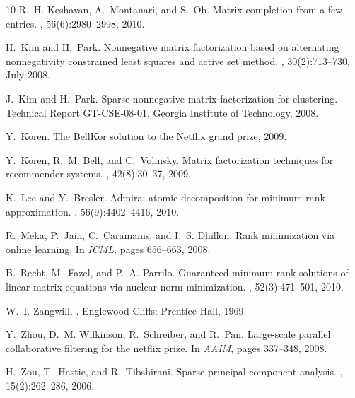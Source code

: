 \documentclass[11pt]{article}
\theoremstyle{plain}
\theoremstyle{definition}
\begin{document}
\begin{thebibliography}{10}
R.~H. Keshavan, A.~Montanari, and S.~Oh.
\newblock Matrix completion from a few entries.
, 56(6):2980--2998,
  2010.

H.~Kim and H.~Park.
\newblock Nonnegative matrix factorization based on alternating nonnegativity
  constrained least squares and active set method.
, 30(2):713--730, July 2008.

J.~Kim and H.~Park.
\newblock Sparse nonnegative matrix factorization for clustering.
\newblock Technical Report GT-CSE-08-01, Georgia Institute of Technology, 2008.

Y.~Koren.
\newblock The {B}ell{K}or solution to the {N}etflix grand prize, 2009.

Y.~Koren, R.~M. Bell, and C.~Volinsky.
\newblock Matrix factorization techniques for recommender systems.
, 42(8):30--37, 2009.

K.~Lee and Y.~Bresler.
\newblock Admira: atomic decomposition for minimum rank approximation.
, 56(9):4402--4416,
  2010.

R.~Meka, P.~Jain, C.~Caramanis, and I.~S. Dhillon.
\newblock Rank minimization via online learning.
\newblock In {\em ICML}, pages 656--663, 2008.

B.~Recht, M.~Fazel, and P.~A. Parrilo.
\newblock Guaranteed minimum-rank solutions of linear matrix equations via
  nuclear norm minimization.
, 52(3):471--501, 2010.

W.~I. Zangwill.
.
\newblock Englewood Cliffs: Prentice-Hall, 1969.

Y.~Zhou, D.~M. Wilkinson, R.~Schreiber, and R.~Pan.
\newblock Large-scale parallel collaborative filtering for the netflix prize.
\newblock In {\em AAIM}, pages 337--348, 2008.

H.~Zou, T.~Hastie, and R.~Tibshirani.
\newblock Sparse principal component analysis.
, 15(2):262--286, 2006.

\end{thebibliography}

%
%
\onecolumn
\appendix
\end{document}
